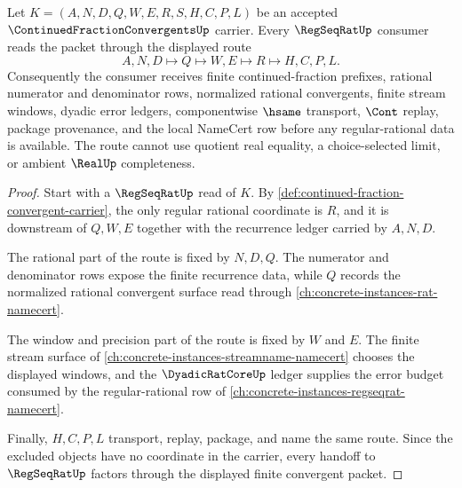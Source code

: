 \begin{theorem}
\label{thm:continued-fraction-convergent-regseqrat-handoff}
Let $K=(A,N,D,Q,W,E,R,S,H,C,P,L)$ be an accepted
$\ContinuedFractionConvergentsUp$ carrier. Every $\RegSeqRatUp$ consumer reads
the packet through the displayed route
$$
A,N,D \longmapsto Q \longmapsto W,E \longmapsto R \longmapsto H,C,P,L .
$$
Consequently the consumer receives finite continued-fraction prefixes,
rational numerator and denominator rows, normalized rational convergents,
finite stream windows, dyadic error ledgers, componentwise $\hsame$ transport,
$\Cont$ replay, package provenance, and the local NameCert row before any
regular-rational data is available. The route cannot use quotient real
equality, a choice-selected limit, or ambient $\RealUp$ completeness.
\end{theorem}
\begin{proof}
Start with a $\RegSeqRatUp$ read of $K$. By
\autoref{def:continued-fraction-convergent-carrier}, the only regular
rational coordinate is $R$, and it is downstream of $Q,W,E$ together with the
recurrence ledger carried by $A,N,D$.

The rational part of the route is fixed by $N,D,Q$. The numerator and
denominator rows expose the finite recurrence data, while $Q$ records the
normalized rational convergent surface read through
\autoref{ch:concrete-instances-rat-namecert}.

The window and precision part of the route is fixed by $W$ and $E$. The
finite stream surface of
\autoref{ch:concrete-instances-streamname-namecert} chooses the displayed
windows, and the $\DyadicRatCoreUp$ ledger supplies the error budget consumed
by the regular-rational row of
\autoref{ch:concrete-instances-regseqrat-namecert}.

Finally, $H,C,P,L$ transport, replay, package, and name the same route. Since
the excluded objects have no coordinate in the carrier, every handoff to
$\RegSeqRatUp$ factors through the displayed finite convergent packet.
\end{proof}

